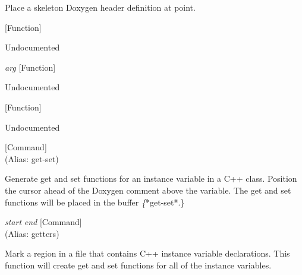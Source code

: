 \begin{doc-string}
Place a skeleton Doxygen header definition at point.
\end{doc-string}

\vspace{1em}
\noindent
{}
\usebox{\funcname}
 \hfill [Function]

\begin{doc-string}
Undocumented
\end{doc-string}

\vspace{1em}
\noindent
{}
\usebox{\funcname}\emph{arg}
 \hfill [Function]

\begin{doc-string}
Undocumented
\end{doc-string}

\vspace{1em}
\noindent
{}
\usebox{\funcname}
 \hfill [Function]

\begin{doc-string}
Undocumented
\end{doc-string}

\vspace{1em}
\noindent
{}
\usebox{\funcname}
 \hfill [Command]\\%
 (Alias: get-set)

\begin{doc-string}
Generate get and set functions for an instance variable in a C++ class.
Position the cursor ahead of the Doxygen comment above the variable.  The get
and set functions will be placed in the buffer \emph\{*get-set*.\}
\end{doc-string}

\vspace{1em}
\noindent
{}
\usebox{\funcname}\emph{start} \emph{end}
 \hfill [Command]\\%
 (Alias: getters)

\begin{doc-string}
Mark a region in a file that contains C++ instance variable declarations.
This function will create get and set functions for all of the instance
variables.
\end{doc-string}

